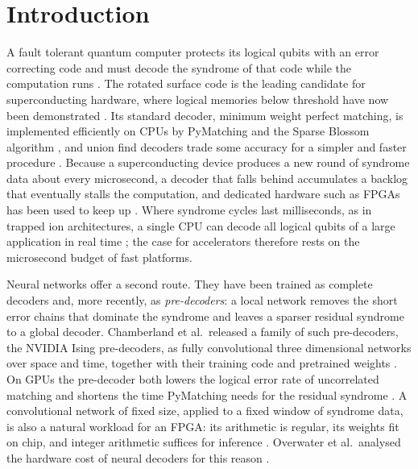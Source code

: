 \section{Introduction}\label{sec:intro}

A fault tolerant quantum computer protects its logical qubits with an error correcting code and must decode the
syndrome of that code while the computation runs \cite{dennis2002topological,fowler2012surface}. The rotated surface
code \cite{kitaev2003anyons,fowler2012surface} is the leading candidate for superconducting hardware, where logical memories below threshold have now been
demonstrated \cite{google2023scaling,google2025below}. Its standard decoder, minimum weight perfect matching, is
implemented efficiently on CPUs by PyMatching and the Sparse Blossom algorithm \cite{higgott2022pymatching,
higgott2025sparse}, and union find decoders trade some accuracy for a simpler and faster procedure
\cite{delfosse2021unionfind}. Because a superconducting device produces a new round of syndrome data about every
microsecond, a decoder that falls behind accumulates a backlog that eventually stalls the computation, and dedicated
hardware such as FPGAs has been used to keep up \cite{das2022lilliput,liyanage2023fpga,liyanage2024distributed,
barber2025decoder}. Where syndrome cycles last milliseconds, as in trapped ion architectures, a single CPU can decode
all logical qubits of a large application in real time \cite{ye2026megaquop}; the case for accelerators therefore
rests on the microsecond budget of fast platforms.

Neural networks offer a second route. They have been trained as complete decoders \cite{torlai2017neural,
chamberland2018deep,gicev2023scalable,bausch2024alphaqubit} and, more recently, as \emph{pre-decoders}: a local
network removes the short error chains that dominate the syndrome and leaves a sparser residual syndrome to a global
decoder. Chamberland et al.\ released a family of such pre-decoders, the NVIDIA Ising pre-decoders, as fully
convolutional three dimensional networks over space and time, together with their training code and pretrained
weights \cite{chamberland2026predecoder,nvidia_ising_code,nvidia_fast_card,nvidia_accurate_card}. On GPUs the
pre-decoder both lowers the logical error rate of uncorrelated matching and shortens the time PyMatching needs for the
residual syndrome \cite{chamberland2026predecoder}. A convolutional network of fixed size, applied to a fixed window of
syndrome data, is also a natural workload for an FPGA: its arithmetic is regular, its weights fit on chip, and
integer arithmetic suffices for inference \cite{jacob2018quantization,zhang2015optimizing,umuroglu2017finn,
duarte2018hls4ml}. Overwater et al.\ analysed the hardware cost of neural decoders for this reason
\cite{overwater2022neural}.

